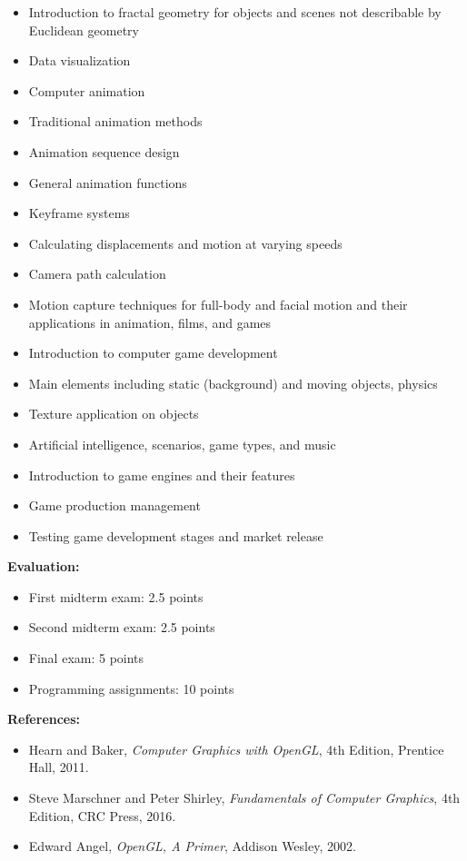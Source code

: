 \documentclass[12pt]{article}
\begin{document}
\begin{itemize}
    \item Introduction to fractal geometry for objects and scenes not describable by Euclidean geometry
    \item Data visualization
    \item Computer animation
    \item Traditional animation methods
    \item Animation sequence design
    \item General animation functions
    \item Keyframe systems
    \item Calculating displacements and motion at varying speeds
    \item Camera path calculation
    \item Motion capture techniques for full-body and facial motion and their applications in animation, films, and games
    \item Introduction to computer game development
    \item Main elements including static (background) and moving objects, physics
    \item Texture application on objects
    \item Artificial intelligence, scenarios, game types, and music
    \item Introduction to game engines and their features
    \item Game production management
    \item Testing game development stages and market release
\end{itemize}

\textbf{Evaluation:}
\begin{itemize}
    \item First midterm exam: 2.5 points
    \item Second midterm exam: 2.5 points
    \item Final exam: 5 points
    \item Programming assignments: 10 points
\end{itemize}

\textbf{References:}
\begin{itemize}
    \item Hearn and Baker, \textit{Computer Graphics with OpenGL}, 4th Edition, Prentice Hall, 2011.
    \item Steve Marschner and Peter Shirley, \textit{Fundamentals of Computer Graphics}, 4th Edition, CRC Press, 2016.
    \item Edward Angel, \textit{OpenGL, A Primer}, Addison Wesley, 2002.
\end{itemize}
\end{document}
